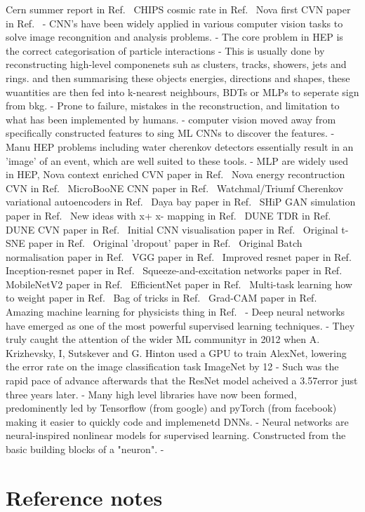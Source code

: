 Cern summer report in Ref.~\cite{theodore2016}
CHIPS cosmic rate in Ref.~\cite{son2013}
Nova first CVN paper in Ref.~\cite{aurisano2016}
- CNN's have been widely applied in various computer vision tasks to solve image recongnition and analysis problems.
- The core problem in HEP is the correct categorisation of particle interactions
- This is usually done by reconstructing high-level componenets suh as clusters, tracks, showers, jets and rings. and
then summarising these objects energies, directions and shapes, these wuantities are then fed into k-nearest neighbours,
BDTs or MLPs to seperate sign from bkg.
- Prone to failure, mistakes in the reconstruction, and limitation to what has been implemented by humans.
- computer vision moved away from specifically constructed features to sing ML CNNs to discover the features.
- Manu HEP problems including water cherenkov detectors essentially result in an 'image' of an event, which are well suited to these tools.
- MLP are widely used in HEP,
Nova context enriched CVN paper in Ref.~\cite{psihas2019}
Nova energy recontruction CVN in Ref.~\cite{baldi2019}
MicroBooNE CNN paper in Ref.~\cite{acciarri2017}
Watchmal/Triumf Cherenkov variational autoencoders in Ref.~\cite{abhishek2019}
Daya bay paper in Ref.~\cite{racah2016}
SHiP GAN simulation paper in Ref.~\cite{ahdida2019}
New ideas with x+ x- mapping in Ref.~\cite{berns2020}
DUNE TDR in Ref.~\cite{abi2020}
DUNE CVN paper in Ref.~\cite{collaboration2020}
Initial CNN visualisation paper in Ref.~\cite{zeiler2013}
Original t-SNE paper in Ref.~\cite{maaten2008}
Original 'dropout' paper in Ref.~\cite{hinton2012}
Original Batch normalisation paper in Ref.~\cite{ioffe2015}
VGG paper in Ref.~\cite{simonyan2014}
Improved resnet paper in Ref.~\cite{he2016}
Inception-resnet paper in Ref.~\cite{szegedy2016}
Squeeze-and-excitation networks paper in Ref.~\cite{hu2017}
MobileNetV2 paper in Ref.~\cite{sandler2018}
EfficientNet paper in Ref.~\cite{tan2019}
Multi-task learning how to weight paper in Ref.~\cite{kendall2017}
Bag of tricks in Ref.~\cite{he2018}
Grad-CAM paper in Ref.~\cite{elvaraju2019}
Amazing machine learning for physicists thing in Ref.~\cite{mehta2019}
- Deep neural networks have emerged as one of the most powerful supervised learning techniques.
- They truly caught the attention of the wider ML communityr in 2012 when A. Krizhevsky, I, Sutskever and G. Hinton used a GPU to train
AlexNet, lowering the error rate on the image classification task ImageNet by 12%
- Such was the rapid pace of advance afterwards that the ResNet model acheived a 3.57\percent error just three years later.
- Many high level libraries have now been formed, predominently led by Tensorflow (from google) and pyTorch (from facebook) making it easier to quickly code and implemenetd DNNs.
- Neural networks are neural-inspired nonlinear models for supervised learning. Constructed from the basic building blocks of a "neuron".
-


\section{Reference notes}